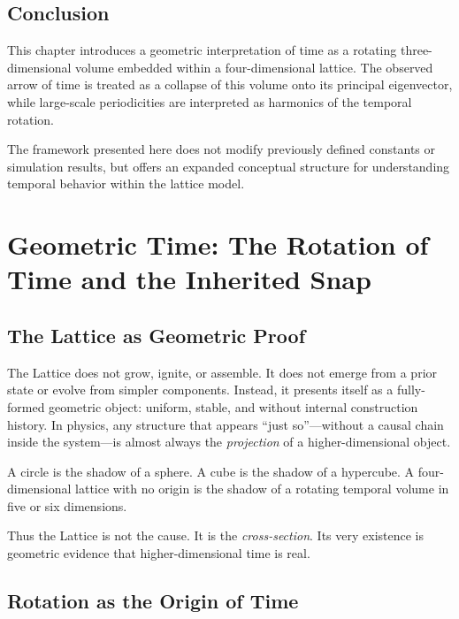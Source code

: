 \documentclass[11pt, letterpaper, openany]{book}
\begin{document}
\section{Conclusion}
This chapter introduces a geometric interpretation of time as a rotating 
three-dimensional volume embedded within a four-dimensional lattice. The 
observed arrow of time is treated as a collapse of this volume onto its 
principal eigenvector, while large-scale periodicities are interpreted as 
harmonics of the temporal rotation.

The framework presented here does not modify previously defined constants or 
simulation results, but offers an expanded conceptual structure for 
understanding temporal behavior within the lattice model.

\chapter{Geometric Time: The Rotation of Time and the Inherited Snap}
\label{chap:temporal-rotation}

\section{The Lattice as Geometric Proof}

The Lattice does not grow, ignite, or assemble. It does not emerge from
a prior state or evolve from simpler components. Instead, it presents
itself as a fully-formed geometric object: uniform, stable, and without
internal construction history. In physics, any structure that appears
``just so''---without a causal chain inside the system---is almost
always the \emph{projection} of a higher-dimensional object.

A circle is the shadow of a sphere.  
A cube is the shadow of a hypercube.  
A four-dimensional lattice with no origin is the shadow of a rotating
temporal volume in five or six dimensions.

Thus the Lattice is not the cause.  
It is the \emph{cross-section}.  
Its very existence is geometric evidence that higher-dimensional time
is real.

\section{Rotation as the Origin of Time}
\end{document}
